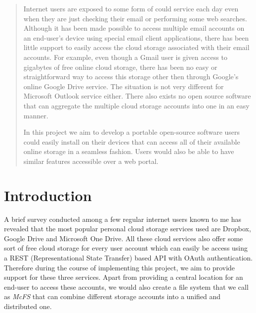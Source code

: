 \begin{abstract}
Internet users are exposed to some form of could service each day even when they are just checking their email or performing some web searches. Although it has been made possible to access multiple email accounts on an end-user's device using special email client applications, there has been little support to easily access the cloud storage associated with their email accounts. For example, even though a Gmail user is given access to gigabytes of free online cloud storage, there has been no easy or straightforward way to access this storage other then through Google's online Google Drive service. The situation is not very different for Microsoft Outlook service either. There also exists no open source software that can aggregate the multiple cloud storage accounts into one in an easy manner.

In this project we aim to develop a portable open-source software users could easily install on their devices that can access all of their available online storage in a seamless fashion. Users would also be able to have similar features accessible over a web portal.
\end{abstract}


\section{Introduction}
A brief survey conducted among a few regular internet users known to me has revealed that the most popular personal cloud storage services used are Dropbox, Google Drive and Microsoft One Drive. All these cloud services also offer some sort of free cloud storage for every user account which can easily be access using a REST (Representational State Transfer) based API with OAuth authentication. Therefore during the course of implementing this project, we aim to provide support for these three services. Apart from providing a central location for an end-user to access these accounts, we would also create a file system that we call as \emph{McFS} that can combine different storage accounts into a unified and distributed one.


